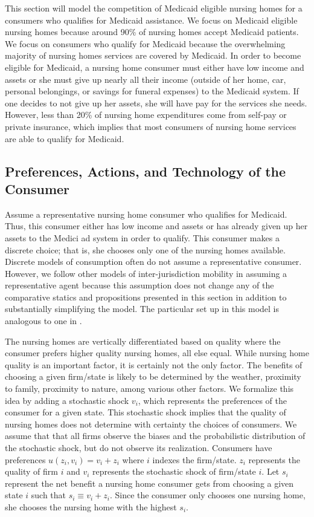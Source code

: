 \documentclass[../Main.tex]{subfiles}
\begin{document}
This section will model the competition of Medicaid eligible nursing homes for a consumers who qualifies for Medicaid assistance. We focus on Medicaid eligible nursing homes because around 90\% of nursing homes accept Medicaid patients. We focus on consumers who qualify for Medicaid because the overwhelming majority of nursing homes services are covered by Medicaid. In order to become eligible for Medicaid, a nursing home consumer must either have low income and assets or she must give up nearly all their income (outside of her home, car, personal belongings, or savings for funeral expenses) to the Medicaid system. If one decides to not give up her assets, she will have pay for the services she needs. However, less than 20\% of nursing home expenditures come from self-pay or private insurance, which implies that most consumers of nursing home services are able to qualify for Medicaid. 

\subsection{Preferences, Actions, and Technology of the Consumer}
Assume a representative nursing home consumer who qualifies for Medicaid. Thus, this consumer either has low income and assets or has already given up her assets to the Medici ad system in order to qualify. This consumer makes a discrete choice; that is, she chooses only one of the nursing homes available. Discrete models of consumption often do not assume a representative consumer. However, we follow other models of inter-jurisdiction mobility in assuming a representative agent because this assumption does not change any of the comparative statics and propositions presented in this section in addition to substantially simplifying the model. The particular set up in this model is analogous to one in \citet{basinger2004remodeling}.

The nursing homes are vertically differentiated based on quality where the consumer prefers higher quality nursing homes, all else equal. While nursing home quality is an important factor, it is certainly not the only factor. The benefits of choosing a given firm/state is likely to be determined by the weather, proximity to family, proximity to nature, among various other factors. We formalize this idea by adding a stochastic shock $v_i$, which represents the preferences of the consumer for a given state. This stochastic shock implies that the quality of nursing homes does not determine with certainty the choices of consumers. We assume that that all firms observe the biases and the probabilistic distribution of the stochastic shock, but do not observe its realization. Consumers have preferences $u(z_i,v_i) = v_i + z_i$ where $i$ indexes the firm/state. $z_i$ represents the quality of firm $i$ and $v_i$ represents the stochastic shock of firm/state $i$. Let $s_i$ represent the net benefit a nursing home consumer gets from choosing a given state $i$ such that $s_i \equiv v_i + z_i$. Since the consumer only chooses one nursing home, she chooses the nursing home with the highest $s_i$.
\end{document}

